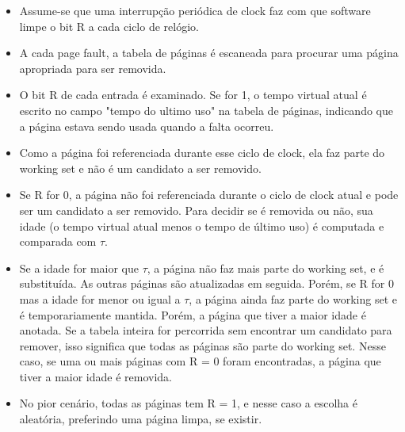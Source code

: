 \documentclass[10pt]{article}
\begin{document}
\begin{itemize}
\begin{itemize}
            \item Assume-se que uma interrupção periódica de clock faz com que software
                limpe o bit R a cada ciclo de relógio.
            \item A cada page fault, a tabela de páginas é escaneada para procurar uma
                página apropriada para ser removida.
            \item O bit R de cada entrada é examinado. Se for 1, o tempo virtual atual é 
                escrito no campo "tempo do ultimo uso" na tabela de páginas, indicando 
                que a página estava sendo usada quando a falta ocorreu. 
            \item Como a página foi referenciada durante esse ciclo de clock, ela
                faz parte do working set e não é um candidato a ser removido.
            \item Se R for 0, a página não foi referenciada durante o ciclo de clock
                atual e pode ser um candidato a ser removido. Para decidir se é removida
                ou não, sua idade (o tempo virtual atual menos o tempo de último uso)
                é computada e comparada com \begin{math}\tau\end{math}.
            \item Se a idade for maior que \begin{math}\tau\end{math}, a página não faz
                mais parte do working set, e é substituída. As outras páginas são 
                atualizadas em seguida. Porém, se R for 0 mas a idade for menor ou
                igual a \begin{math}\tau\end{math}, a página ainda faz parte do
                working set e é temporariamente mantida. Porém, a página que tiver
                a maior idade é anotada. Se a tabela inteira for percorrida sem encontrar
                um candidato para remover, isso significa que todas as páginas são parte
                do working set. Nesse caso, se uma ou mais páginas com R = 0 foram encontradas,
                a página que tiver a maior idade é removida. 
            \item No pior cenário, todas as páginas tem R = 1, e nesse caso a escolha é 
                aleatória, preferindo uma página limpa, se existir.
        \end{itemize}
\end{itemize}
\end{document}
